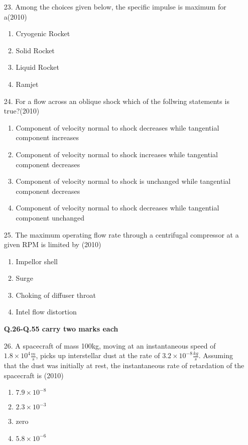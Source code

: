 \documentclass[journal]{IEEEtran}
\begin{document}
\begin{enumerate}
 \item[23.] Among the choices given below, the specific impulse is maximum for a\hfill (2010) 
 \begin{enumerate}[label=(\Alph*)]
    \item Cryogenic Rocket
    \item Solid Rocket
    \item Liquid Rocket
    \item Ramjet
 \end{enumerate}
\item[24.] For a flow across an oblique shock which of the follwing statements is true?\hfill (2010)
\begin{enumerate}[label=(\Alph*)]
    \item Component of velocity normal to shock decreases while tangential component increases
    \item Component of velocity normal to shock increases while tangential component decreases
    \item Component of velocity normal to shock is unchanged while tangential component decreases
    \item Component of velocity normal to shock decreases while tangential component unchanged
\end{enumerate}
\item[25.] The maximum operating flow rate through a centrifugal compressor at a given RPM is limited by \hfill (2010) 
\begin{enumerate}[label=(\Alph*)]
    \item Impellor shell
    \item Surge
    \item Choking of diffuser throat
    \item Intel flow distortion
\end{enumerate}
\textbf{Q.26-Q.55 carry two marks each}
\item[26.] A spacecraft of mass 100kg, moving at an instantaneous speed of $1.8\times 10^4\frac{m}{s}$, picks up interstellar dust at the rate of $3.2\times 10^{-8}\frac{kg}{s}$. Assuming that the dust was initially at rest, the instantaneous rate of retardation of the spacecraft is \hfill (2010)
\begin{enumerate}[label=(\Alph*)]
    \item $7.9\times10^{-8}$
    \item $2.3\times10^{-3}$
    \item zero
    \item $5.8\times10^{-6}$
\end{enumerate}
\end{enumerate}
\end{document}
